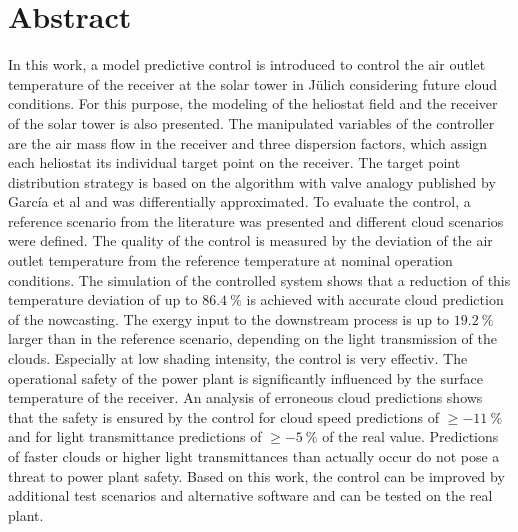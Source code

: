 \chapter*{Abstract}
In this work, a model predictive control is introduced to control the air outlet temperature of the receiver at the solar tower in Jülich considering future cloud conditions.
For this purpose, the modeling of the heliostat field and the receiver of the solar tower is also presented.
The manipulated variables of the controller are the air mass flow in the receiver and three dispersion factors, which assign each heliostat its individual target point on the receiver.
The target point distribution strategy is based on the algorithm with valve analogy published by García et al \cite{Garcia2} and was differentially approximated.
To evaluate the control, a reference scenario from the literature was presented and different cloud scenarios were defined.
The quality of the control is measured by the deviation of the air outlet temperature from the reference temperature at nominal operation conditions.
The simulation of the controlled system shows that a reduction of this temperature deviation of up to $\SI{86.4}{\percent}$ is achieved with accurate cloud prediction of the nowcasting.
The exergy input to the downstream process is up to $\SI{19.2}{\percent}$ larger than in the reference scenario, depending on the light transmission of the clouds.
Especially at low shading intensity, the control is very effectiv.
The operational safety of the power plant is significantly influenced by the surface temperature of the receiver.
An analysis of erroneous cloud predictions shows that the safety is ensured by the control for cloud speed predictions of $\geq\SI{-11}{\percent}$ and for light transmittance predictions of $\geq\SI{-5}{\percent}$ of the real value.
Predictions of faster clouds or higher light transmittances than actually occur do not pose a threat to power plant safety.
Based on this work, the control can be improved by additional test scenarios and alternative software and can be tested on the real plant.
